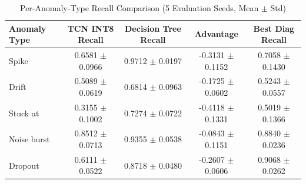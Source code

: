 \begin{table}[t]
\centering
\caption{Per-Anomaly-Type Recall Comparison (5 Evaluation Seeds, Mean $\pm$ Std)}
\label{tab:per_type_recall}
\small
\begin{tabular}{lcccc}
\toprule
\textbf{Anomaly Type} & \textbf{TCN INT8 Recall} & \textbf{Decision Tree Recall} & \textbf{Advantage} & \textbf{Best Diag Recall} \\
\midrule
Spike & 0.6581 $\pm$ 0.0966 & 0.9712 $\pm$ 0.0197 & -0.3131 $\pm$ 0.1152 & 0.7058 $\pm$ 0.1430 \\
Drift & 0.5089 $\pm$ 0.0619 & 0.6814 $\pm$ 0.0963 & -0.1725 $\pm$ 0.0602 & 0.5243 $\pm$ 0.0557 \\
Stuck at & 0.3155 $\pm$ 0.1002 & 0.7274 $\pm$ 0.0722 & -0.4118 $\pm$ 0.1331 & 0.5019 $\pm$ 0.1366 \\
Noise burst & 0.8512 $\pm$ 0.0713 & 0.9355 $\pm$ 0.0538 & -0.0843 $\pm$ 0.1151 & 0.8840 $\pm$ 0.0236 \\
Dropout & 0.6111 $\pm$ 0.0522 & 0.8718 $\pm$ 0.0480 & -0.2607 $\pm$ 0.0606 & 0.9068 $\pm$ 0.0262 \\
\bottomrule
\end{tabular}
\end{table}